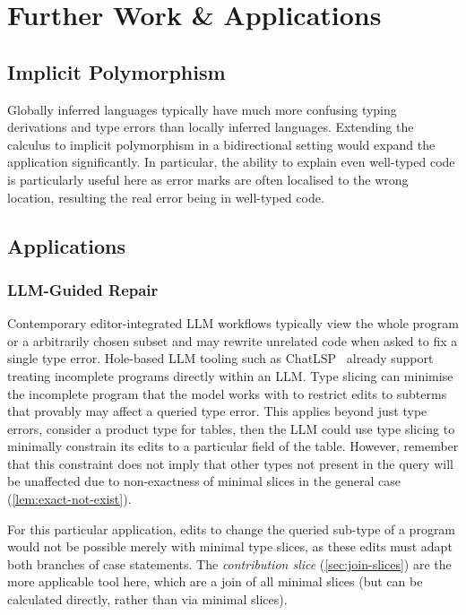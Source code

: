 \section{Further Work \& Applications}
\label{sec:further-work}

\subsection{Implicit Polymorphism}
\label{sec:future-implicit}

Globally inferred languages typically have much more confusing typing derivations and type errors than locally inferred languages. Extending the calculus to implicit polymorphism in a bidirectional setting would expand the application significantly. In particular, the ability to explain even well-typed code is particularly useful here as error marks are often localised to the wrong location, resulting the real error being in well-typed code.

\subsection{Applications}
\label{sec:applications}

\subsubsection{LLM-Guided Repair}
\label{sec:app-llm}

Contemporary editor-integrated LLM workflows typically view the whole program or a arbitrarily chosen subset and may rewrite unrelated code when asked to fix a single type error. Hole-based LLM tooling such as ChatLSP~\cite{ChatLSP} already support treating incomplete programs directly within an LLM. Type slicing can minimise the incomplete program that the model works with to restrict edits to subterms that provably may affect a queried type error. This applies beyond just type errors, consider a product type for tables, then the LLM could use type slicing to minimally constrain its edits to a particular field of the table. However, remember that this constraint does not imply that other types not present in the query will be unaffected due to non-exactness of minimal slices in the general case (\cref{lem:exact-not-exist}).

For this particular application, edits to change the queried sub-type of a program would not be possible merely with minimal type slices, as these edits must adapt both branches of case statements. The \emph{contribution slice} (\cref{sec:join-slices}) are the more applicable tool here, which are a join of all minimal slices (but can be calculated directly, rather than via minimal slices).

